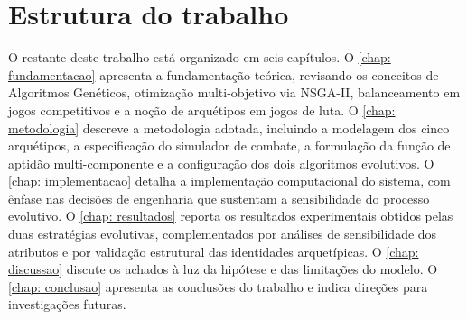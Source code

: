 \section{Estrutura do trabalho}

O restante deste trabalho está organizado em seis capítulos. O \autoref{chap: fundamentacao} apresenta a fundamentação teórica, revisando os conceitos de Algoritmos Genéticos, otimização multi-objetivo via NSGA-II, balanceamento em jogos competitivos e a noção de arquétipos em jogos de luta. O \autoref{chap: metodologia} descreve a metodologia adotada, incluindo a modelagem dos cinco arquétipos, a especificação do simulador de combate, a formulação da função de aptidão multi-componente e a configuração dos dois algoritmos evolutivos. O \autoref{chap: implementacao} detalha a implementação computacional do sistema, com ênfase nas decisões de engenharia que sustentam a sensibilidade do processo evolutivo. O \autoref{chap: resultados} reporta os resultados experimentais obtidos pelas duas estratégias evolutivas, complementados por análises de sensibilidade dos atributos e por validação estrutural das identidades arquetípicas. O \autoref{chap: discussao} discute os achados à luz da hipótese e das limitações do modelo. O \autoref{chap: conclusao} apresenta as conclusões do trabalho e indica direções para investigações futuras.